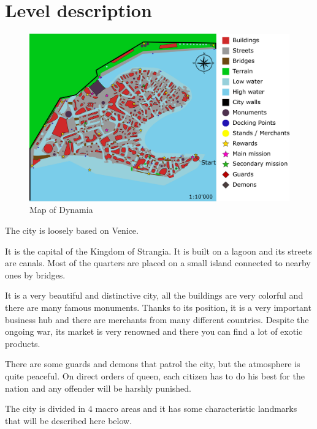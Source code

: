 \section{Level description}

\begin{center}
  \begin{figure}[H]
    \centering
    \includegraphics[width=\textwidth]{Images/Maps/dynamia}
    \caption{Map of Dynamia}
  \end{figure}
\end{center}

The city is loosely based on Venice.

It is the capital of the Kingdom of Strangia. It is built on a lagoon and its streets are canals. Most of the quarters are placed on a small island connected to nearby ones by bridges.

It is a very beautiful and distinctive city, all the buildings are very colorful and there are many famous monuments. Thanks to its position, it is a very important business hub and there are merchants from many different countries. Despite the ongoing war, its market is very renowned and there you can find a lot of exotic products.

There are some guards and demons that patrol the city, but the atmosphere is quite peaceful. On direct orders of queen, each citizen has to do his best for the nation and any offender will be harshly punished.

The city is divided in 4 macro areas and it has some characteristic landmarks that will be described here below.

